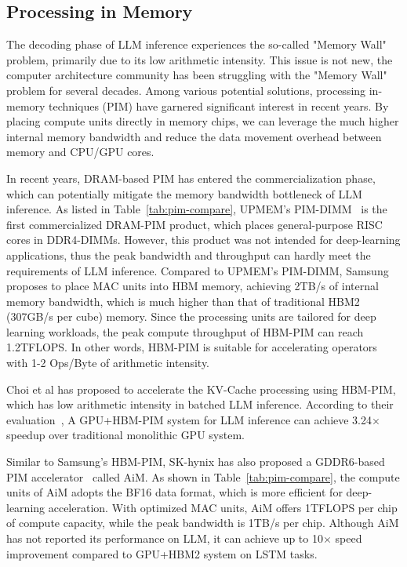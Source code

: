 \subsection{Processing in Memory}

The decoding phase of LLM inference experiences the so-called "Memory Wall" problem, primarily due to its low arithmetic intensity. This issue is not new, the computer architecture community has been struggling with the "Memory Wall" problem for several decades. Among various potential solutions, processing in-memory  techniques (PIM) have garnered significant interest in recent years. By placing compute units directly in memory chips, we can leverage the much higher internal memory bandwidth and reduce the data movement overhead between memory and CPU/GPU cores. 

In recent years, DRAM-based PIM has entered the commercialization phase, which can potentially mitigate the memory bandwidth bottleneck of LLM inference. As listed in Table~\ref{tab:pim-compare}, UPMEM's PIM-DIMM~\cite{upmem} is the first commercialized DRAM-PIM product, which places general-purpose RISC cores in DDR4-DIMMs. However, this product was not intended for deep-learning applications, thus the peak bandwidth and throughput can hardly meet the requirements of LLM inference. Compared to UPMEM's PIM-DIMM, Samsung proposes to place MAC units into HBM memory, achieving 2TB/s of internal memory bandwidth, which is much higher than that of traditional HBM2 (307GB/s per cube) memory. Since the processing units are tailored for deep learning workloads, the peak compute throughput of HBM-PIM can reach 1.2TFLOPS. In other words, HBM-PIM is suitable for accelerating operators with 1-2 Ops/Byte of arithmetic intensity. 

 Choi et al has proposed to accelerate the KV-Cache processing using HBM-PIM, which has low arithmetic intensity in batched LLM inference. According to their evaluation~\cite{choi2023unleashing}, A GPU+HBM-PIM system for LLM inference can achieve 3.24$\times$ speedup over traditional  monolithic GPU system. 

 

Similar to Samsung's HBM-PIM, SK-hynix has also proposed a GDDR6-based PIM accelerator~\cite{gddr-pim} called AiM. As shown in Table~\ref{tab:pim-compare}, the compute units of AiM adopts the BF16 data format, which is more efficient for deep-learning acceleration. With optimized MAC units, AiM offers 1TFLOPS per chip of compute capacity, while the peak bandwidth is 1TB/s per chip. Although AiM has not reported its performance on LLM, it can achieve up to 10$\times$ speed improvement compared to GPU+HBM2 system on LSTM tasks. 

